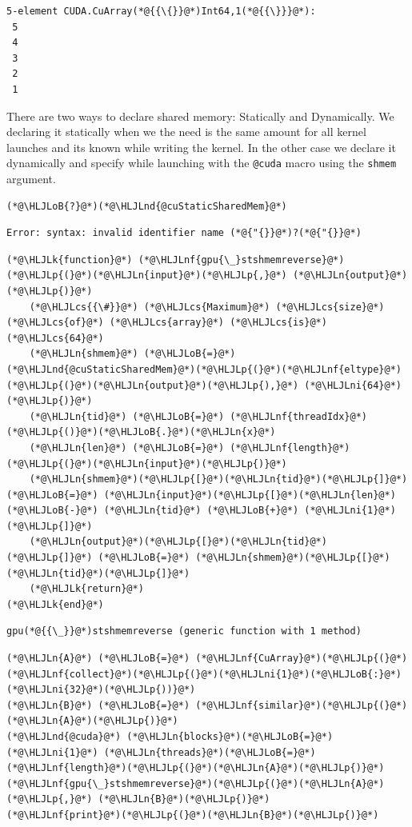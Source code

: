 \documentclass[12pt,a4paper]{article}
\newcommand{\HLJLk}[1]{\textcolor[RGB]{148,91,176}{\textbf{#1}}}
\newcommand{\HLJLn}[1]{#1}
\newcommand{\HLJLnd}[1]{\textcolor[RGB]{214,102,97}{#1}}
\newcommand{\HLJLnf}[1]{\textcolor[RGB]{66,102,213}{#1}}
\newcommand{\HLJLni}[1]{\textcolor[RGB]{59,151,46}{#1}}
\newcommand{\HLJLoB}[1]{\textcolor[RGB]{102,102,102}{\textbf{#1}}}
\newcommand{\HLJLp}[1]{#1}
\newcommand{\HLJLcs}[1]{\textcolor[RGB]{153,153,119}{\textit{#1}}}
\begin{document}
\begin{lstlisting}
5-element CUDA.CuArray(*@{{\{}}@*)Int64,1(*@{{\}}}@*):
 5
 4
 3
 2
 1
\end{lstlisting}


There are two ways to declare shared memory: Statically and Dynamically. We declaring it statically when we the need is the same amount for all kernel launches and its known while writing the kernel. In the other case we declare it dynamically and specify while launching with the \texttt{@cuda} macro using the \texttt{shmem} argument.


\begin{lstlisting}
(*@\HLJLoB{?}@*)(*@\HLJLnd{@cuStaticSharedMem}@*)
\end{lstlisting}

\begin{lstlisting}
Error: syntax: invalid identifier name (*@{"{}}@*)?(*@{"{}}@*)
\end{lstlisting}


\begin{lstlisting}
(*@\HLJLk{function}@*) (*@\HLJLnf{gpu{\_}stshmemreverse}@*)(*@\HLJLp{(}@*)(*@\HLJLn{input}@*)(*@\HLJLp{,}@*) (*@\HLJLn{output}@*)(*@\HLJLp{)}@*)
    (*@\HLJLcs{{\#}}@*) (*@\HLJLcs{Maximum}@*) (*@\HLJLcs{size}@*) (*@\HLJLcs{of}@*) (*@\HLJLcs{array}@*) (*@\HLJLcs{is}@*) (*@\HLJLcs{64}@*)
    (*@\HLJLn{shmem}@*) (*@\HLJLoB{=}@*) (*@\HLJLnd{@cuStaticSharedMem}@*)(*@\HLJLp{(}@*)(*@\HLJLnf{eltype}@*)(*@\HLJLp{(}@*)(*@\HLJLn{output}@*)(*@\HLJLp{),}@*) (*@\HLJLni{64}@*)(*@\HLJLp{)}@*)
    (*@\HLJLn{tid}@*) (*@\HLJLoB{=}@*) (*@\HLJLnf{threadIdx}@*)(*@\HLJLp{()}@*)(*@\HLJLoB{.}@*)(*@\HLJLn{x}@*)
    (*@\HLJLn{len}@*) (*@\HLJLoB{=}@*) (*@\HLJLnf{length}@*)(*@\HLJLp{(}@*)(*@\HLJLn{input}@*)(*@\HLJLp{)}@*)
    (*@\HLJLn{shmem}@*)(*@\HLJLp{[}@*)(*@\HLJLn{tid}@*)(*@\HLJLp{]}@*) (*@\HLJLoB{=}@*) (*@\HLJLn{input}@*)(*@\HLJLp{[}@*)(*@\HLJLn{len}@*) (*@\HLJLoB{-}@*) (*@\HLJLn{tid}@*) (*@\HLJLoB{+}@*) (*@\HLJLni{1}@*)(*@\HLJLp{]}@*)
    (*@\HLJLn{output}@*)(*@\HLJLp{[}@*)(*@\HLJLn{tid}@*)(*@\HLJLp{]}@*) (*@\HLJLoB{=}@*) (*@\HLJLn{shmem}@*)(*@\HLJLp{[}@*)(*@\HLJLn{tid}@*)(*@\HLJLp{]}@*)
    (*@\HLJLk{return}@*)
(*@\HLJLk{end}@*)
\end{lstlisting}

\begin{lstlisting}
gpu(*@{{\_}}@*)stshmemreverse (generic function with 1 method)
\end{lstlisting}


\begin{lstlisting}
(*@\HLJLn{A}@*) (*@\HLJLoB{=}@*) (*@\HLJLnf{CuArray}@*)(*@\HLJLp{(}@*)(*@\HLJLnf{collect}@*)(*@\HLJLp{(}@*)(*@\HLJLni{1}@*)(*@\HLJLoB{:}@*)(*@\HLJLni{32}@*)(*@\HLJLp{))}@*)
(*@\HLJLn{B}@*) (*@\HLJLoB{=}@*) (*@\HLJLnf{similar}@*)(*@\HLJLp{(}@*)(*@\HLJLn{A}@*)(*@\HLJLp{)}@*)
(*@\HLJLnd{@cuda}@*) (*@\HLJLn{blocks}@*)(*@\HLJLoB{=}@*)(*@\HLJLni{1}@*) (*@\HLJLn{threads}@*)(*@\HLJLoB{=}@*)(*@\HLJLnf{length}@*)(*@\HLJLp{(}@*)(*@\HLJLn{A}@*)(*@\HLJLp{)}@*) (*@\HLJLnf{gpu{\_}stshmemreverse}@*)(*@\HLJLp{(}@*)(*@\HLJLn{A}@*)(*@\HLJLp{,}@*) (*@\HLJLn{B}@*)(*@\HLJLp{)}@*)
(*@\HLJLnf{print}@*)(*@\HLJLp{(}@*)(*@\HLJLn{B}@*)(*@\HLJLp{)}@*)
\end{lstlisting}
\end{document}

